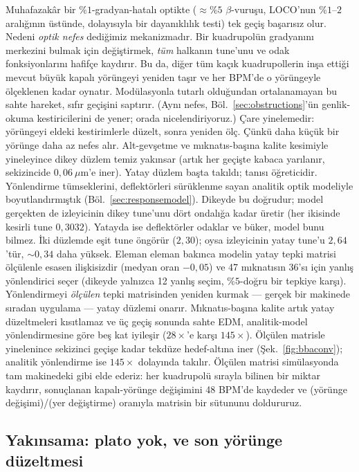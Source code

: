 \documentclass[aps,prab,reprint,superscriptaddress,nofootinbib]{revtex4-2}
\begin{document}
Muhafazakâr bir $\%1$-gradyan-hatalı optikte ($\approx\!\%5$ $\beta$-vuruşu, LOCO'nun
$\%1$--$2$ aralığının üstünde, dolayısıyla bir dayanıklılık testi) tek geçiş
başarısız olur. Nedeni \emph{optik nefes} dediğimiz mekanizmadır. Bir kuadrupolün
gradyanını merkezini bulmak için değiştirmek, \emph{tüm} halkanın tune'unu ve odak
fonksiyonlarını hafifçe kaydırır. Bu da, diğer tüm kaçık kuadrupollerin inşa ettiği
mevcut büyük kapalı yörüngeyi yeniden taşır ve her BPM'de o yörüngeyle ölçeklenen
kadar oynatır. Modülasyonla tutarlı olduğundan ortalanamayan bu sahte hareket, sıfır
geçişini saptırır. (Aynı nefes, Böl.~\ref{sec:obstructions}'ün genlik-okuma
kestiricilerini de yener; orada nicelendiriyoruz.) Çare yinelemedir: yörüngeyi
eldeki kestirimlerle düzelt, sonra yeniden ölç. Çünkü daha küçük bir yörünge daha az
nefes alır. Alt-gevşetme ve mıknatıs-başına kalite kesimiyle yineleyince dikey düzlem
temiz yakınsar (artık her geçişte kabaca yarılanır, sekizincide $0{,}06~\mu$m'e iner).
Yatay düzlem başta takıldı; tanısı öğreticidir. Yönlendirme tümseklerini,
deflektörleri sürüklenme sayan analitik optik modeliyle boyutlandırmıştık
(Böl.~\ref{sec:responsemodel}). Dikeyde bu doğrudur; model gerçekten de izleyicinin dikey
tune'unu dört ondalığa kadar üretir (her ikisinde kesirli tune $0{,}3032$). Yatayda
ise deflektörler odaklar ve büker, model bunu bilmez. İki düzlemde eşit tune öngörür
($2{,}30$); oysa izleyicinin yatay tune'u $2{,}64$'tür, $\sim\!0{,}34$ daha yüksek.
Eleman eleman bakınca modelin yatay tepki matrisi ölçülenle esasen ilişkisizdir
(medyan oran $-0{,}05$) ve 47 mıknatısın 36'sı için yanlış yönlendirici seçer
(dikeyde yalnızca 12 yanlış seçim, $\%5$-doğru bir tepkiye karşı). Yönlendirmeyi
\emph{ölçülen} tepki matrisinden yeniden kurmak --- gerçek bir makinede sıradan
uygulama --- yatay düzlemi onarır. Mıknatıs-başına kalite artık yatay düzeltmeleri
kısıtlamaz ve üç geçiş sonunda sahte EDM, analitik-model yönlendirmesine göre beş
kat iyileşir ($28\times$'e karşı $145\times$). Ölçülen matrisle yinelenince
sekizinci geçişe kadar tekdüze hedef-altına iner (Şek.~\ref{fig:bbaconv}); analitik
yönlendirme ise $145\times$ dolayında takılır. Ölçülen matrisi simülasyonda tam
makinedeki gibi elde ederiz: her kuadrupolü sırayla bilinen bir miktar kaydırır,
sonuçlanan kapalı-yörünge değişimini 48 BPM'de kaydeder ve
(yörünge değişimi)/(yer değiştirme) oranıyla matrisin bir sütununu doldururuz.

\subsection{Yakınsama: plato yok, ve son yörünge düzeltmesi}
\label{sec:bbaconv}
\end{document}

